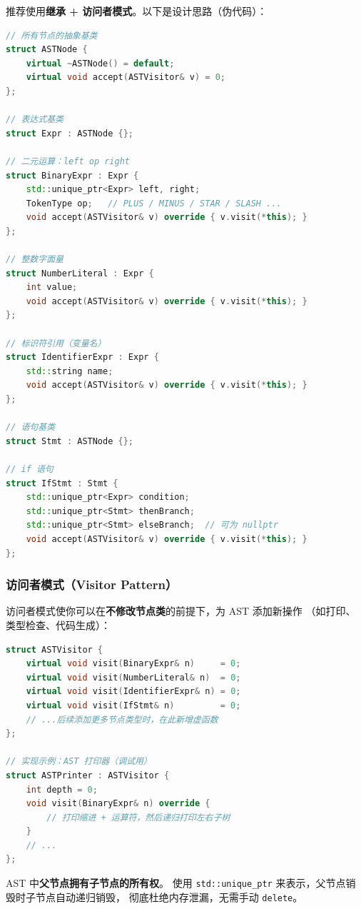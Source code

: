 \documentclass[12pt, a4paper]{ctexart}
\begin{document}
推荐使用\textbf{继承 + 访问者模式}。以下是设计思路（伪代码）：

\begin{lstlisting}[language=C++, caption={AST 节点基类设计思路}]
// 所有节点的抽象基类
struct ASTNode {
    virtual ~ASTNode() = default;
    virtual void accept(ASTVisitor& v) = 0;
};

// 表达式基类
struct Expr : ASTNode {};

// 二元运算：left op right
struct BinaryExpr : Expr {
    std::unique_ptr<Expr> left, right;
    TokenType op;   // PLUS / MINUS / STAR / SLASH ...
    void accept(ASTVisitor& v) override { v.visit(*this); }
};

// 整数字面量
struct NumberLiteral : Expr {
    int value;
    void accept(ASTVisitor& v) override { v.visit(*this); }
};

// 标识符引用（变量名）
struct IdentifierExpr : Expr {
    std::string name;
    void accept(ASTVisitor& v) override { v.visit(*this); }
};

// 语句基类
struct Stmt : ASTNode {};

// if 语句
struct IfStmt : Stmt {
    std::unique_ptr<Expr> condition;
    std::unique_ptr<Stmt> thenBranch;
    std::unique_ptr<Stmt> elseBranch;  // 可为 nullptr
    void accept(ASTVisitor& v) override { v.visit(*this); }
};
\end{lstlisting}

\subsubsection{访问者模式（Visitor Pattern）}

访问者模式使你可以在\textbf{不修改节点类}的前提下，为 AST 添加新操作
（如打印、类型检查、代码生成）：

\begin{lstlisting}[language=C++, caption={访问者接口定义}]
struct ASTVisitor {
    virtual void visit(BinaryExpr& n)     = 0;
    virtual void visit(NumberLiteral& n)  = 0;
    virtual void visit(IdentifierExpr& n) = 0;
    virtual void visit(IfStmt& n)         = 0;
    // ...后续添加更多节点类型时，在此新增虚函数
};

// 实现示例：AST 打印器（调试用）
struct ASTPrinter : ASTVisitor {
    int depth = 0;
    void visit(BinaryExpr& n) override {
        // 打印缩进 + 运算符，然后递归打印左右子树
    }
    // ...
};
\end{lstlisting}

\begin{tipbox}
AST 中\textbf{父节点拥有子节点的所有权}。
使用 \texttt{std::unique\_ptr} 来表示，父节点销毁时子节点自动递归销毁，
彻底杜绝内存泄漏，无需手动 \texttt{delete}。
\end{tipbox}
\end{document}
